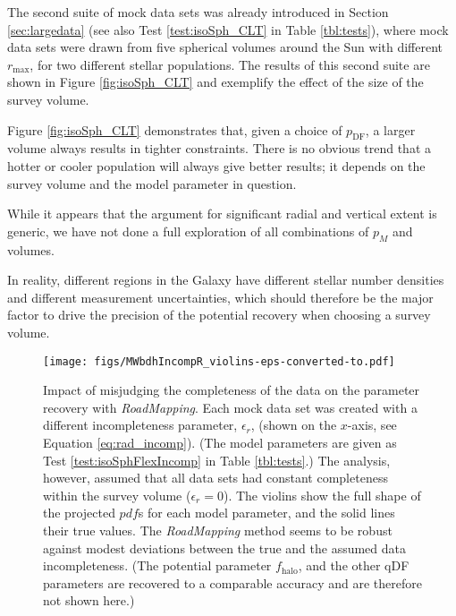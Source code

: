 \documentclass[iop,revtex4,numberedappendix,appendixfloats]{emulateapj}
\newcommand{\pdf}{\ensuremath{pdf}}
\newcommand{\pmodel}{\ensuremath{p_M}}
\newcommand{\RM}{{\sl RoadMapping}}
\begin{document}
The second suite of mock data sets was already introduced in Section \ref{sec:largedata} (see also Test \ref{test:isoSph_CLT} in Table \ref{tbl:tests}), where mock data sets were drawn from five spherical volumes around the Sun with different $r_\text{max}$, for two different stellar populations. The results of this second suite are shown in Figure \ref{fig:isoSph_CLT} and exemplify the effect of the size of the survey volume.

Figure \ref{fig:isoSph_CLT} demonstrates that, given a choice of $p_\text{DF}$, a larger volume always results in tighter constraints. There is no obvious trend that a hotter or cooler population will always give better results; it depends on the survey volume and the model parameter in question.

While it appears that the argument for significant radial and vertical extent is generic, we have not done a full exploration of all combinations of \pmodel{} and volumes.

In reality, different regions in the Galaxy have different stellar number densities and different measurement uncertainties, which should therefore be the major factor to drive the precision of the potential recovery when choosing a survey volume.

\begin{figure}[!htbp]
\centering
\texttt{[image: figs/MWbdhIncompR\_violins-eps-converted-to.pdf]}
\caption{Impact of misjudging the completeness of the data on the parameter recovery with \RM{}. Each mock data set was created with a different incompleteness parameter, $\epsilon_r$, (shown on the $x$-axis, see Equation \eqref{eq:rad_incomp}). (The model parameters are given as Test \ref{test:isoSphFlexIncomp} in Table \ref{tbl:tests}.) The analysis, however, assumed that all data sets had constant completeness within the survey volume ($\epsilon_r = 0$). The violins show the full shape of the projected \pdf{}s for each model parameter, and the solid lines their true values. The \RM{} method seems to be robust against modest deviations between the true and the assumed data incompleteness. (The potential parameter $f_\text{halo}$, and the other qDF parameters are recovered to a comparable accuracy and are therefore not shown here.)} 
\label{fig:MWdhbIncompR_violins}
\end{figure}
\end{document}
